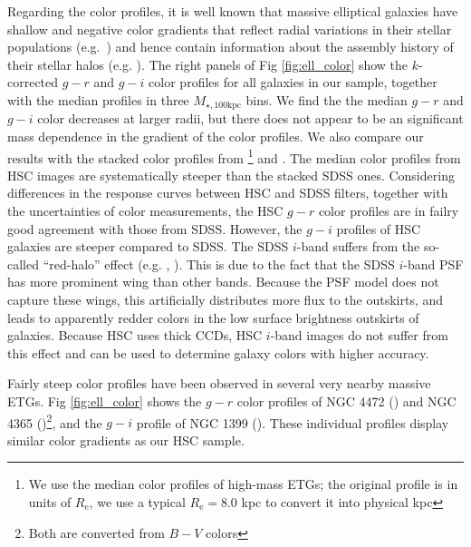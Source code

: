 \documentclass[a4paper,fleqn,usenatbib]{mnras}
\def\mtot{{$M_{\star,100\mathrm{kpc}}$}}
\begin{document}
    Regarding the color profiles, it is well known that massive elliptical galaxies 
    have shallow and negative color gradients that reflect radial variations in their  
    stellar populations (e.g.\ \citealt{Carollo1993, LaBarbera2012}) and hence contain
    information about the assembly history of their stellar halos (e.g. 
    \citealt{Hirschmann2015}). 
    The right panels of Fig \ref{fig:ell_color} show the $k$-corrected $g-r$ and 
    $g-i$ color profiles for all galaxies in our sample, together with the median profiles in three \mtot{} bins. We find the the  median $g-r$ and $g-i$ color  decreases  at larger radii, but there does not appear to be an significant mass dependence in the  gradient of the color profiles. We also compare our results with the stacked color profiles from  \citealt{LaBarbera2010}\footnote{We use the median color profiles of high-mass 
    ETGs; the original profile is in units of $R_{\mathrm{e}}$, we use a typical 
    $R_{\mathrm{e}}=8.0$ kpc to convert it into physical kpc} and 
    \citealt{DSouza2014}.
    The median color profiles from HSC images are systematically steeper than the 
    stacked SDSS ones. 
    Considering differences in the response curves between HSC and SDSS filters, together with the uncertainties of color measurements, the HSC $g-r$ color profiles are  in failry good agreement with  those from SDSS. However, the $g-i$ profiles of HSC galaxies are steeper compared to SDSS. The SDSS $i$-band suffers from the so-called ``red-halo'' effect
    (e.g. \citealt{Wu2005}, \citealt{Tal2011}).  This is due to  the fact that the SDSS $i$-band PSF has more prominent wing than other bands. Because the PSF model does not capture these wings, this artificially distributes more flux to the outskirts, and leads to apparently redder colors in 
    the low surface brightness outskirts of galaxies. Because HSC uses thick CCDs, HSC $i$-band images do not suffer from this effect and can be used to determine galaxy colors with higher accuracy. 
        
    
    Fairly steep color profiles have been observed in several very nearby massive 
    ETGs.  Fig \ref{fig:ell_color} shows the $g-r$ color profiles of 
    NGC 4472 (\citealt{Mihos2013}) and NGC 4365 (\citealt{Mihos2017})\footnote{
    Both are converted from $B-V$ colors}, and the $g-i$ profile of NGC 1399 
    (\citealt{Iodice2016}). These individual profiles  display  similar color gradients as our HSC sample.   
    
\end{document}
